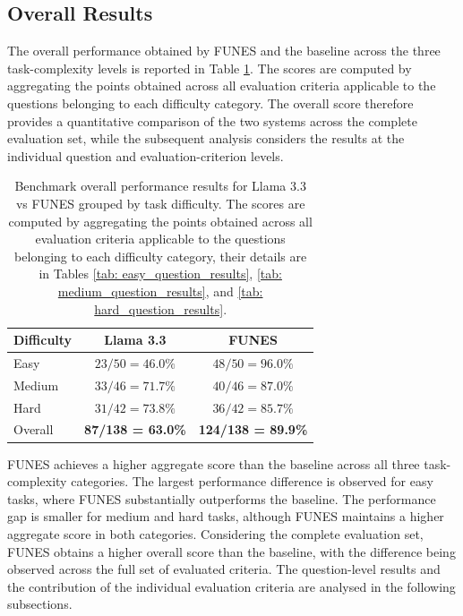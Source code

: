 \subsection{Overall Results}


The overall performance obtained by FUNES and the baseline across the three task-complexity levels is reported in Table \ref{tab:performance_difficulty}. The scores are computed by aggregating the points obtained across all evaluation criteria applicable to the questions belonging to each difficulty category. The overall score therefore provides a quantitative comparison of the two systems across the complete evaluation set, while the subsequent analysis considers the results at the individual question and evaluation-criterion levels.

\begin{table}[htbp]
    \centering
    \caption{Benchmark overall performance results for Llama 3.3 vs FUNES grouped by task difficulty. The scores are computed by aggregating the points obtained across all evaluation criteria applicable to the questions belonging to each difficulty category, their details are in Tables \ref{tab: easy_question_results}, \ref{tab: medium_question_results}, and \ref{tab: hard_question_results}.}
    \label{tab:performance_difficulty}
    \begin{tabular}{l c c}
        \toprule
        \textbf{Difficulty} & \textbf{Llama 3.3} & \textbf{FUNES} \\
        \midrule
        Easy    & $23/50 = 46.0\%$  & $48/50 = 96.0\%$ \\
        Medium  & $33/46 = 71.7\%$  & $40/46 = 87.0\%$ \\
        Hard    & $31/42 = 73.8\%$  & $36/42 = 85.7\%$ \\
        \midrule
        Overall & \textbf{87/138 = 63.0\%} & \textbf{124/138 = 89.9\%} \\
        \bottomrule
    \end{tabular}
\end{table}

FUNES achieves a higher aggregate score than the baseline across all three task-complexity categories. The largest performance difference is observed for easy tasks, where FUNES substantially outperforms the baseline. The performance gap is smaller for medium and hard tasks, although FUNES maintains a higher aggregate score in both categories. Considering the complete evaluation set, FUNES obtains a higher overall score than the baseline, with the difference being observed across the full set of evaluated criteria. The question-level results and the contribution of the individual evaluation criteria are analysed in the following subsections.



